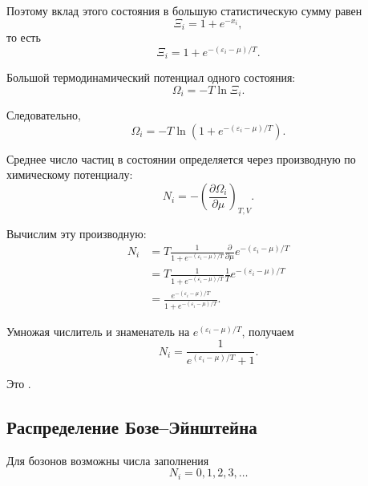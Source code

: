 \documentclass[../final.tex]{subfiles}
\begin{document}
Поэтому вклад этого состояния в большую статистическую сумму равен
%
\begin{equation*}
    \Xi_i
    =
    1+e^{-x_i},
\end{equation*}
%
то есть
%
\[
    \boxed{
        \Xi_i
        =
        1
        +
        e^{-(\varepsilon_i-\mu)/T}
    }.
\]

Большой термодинамический потенциал одного состояния:
%
\begin{equation*}
    \Omega_i
    =
    -T\ln\Xi_i.
\end{equation*}

Следовательно,
%
\[
    \boxed{
        \Omega_i
        =
        -T
        \ln
        \left(
            1
            +
            e^{-(\varepsilon_i-\mu)/T}
        \right)
    }.
\]

Среднее число частиц в состоянии определяется через производную
по химическому потенциалу:
%
\begin{equation*}
    N_i
    =
    -
    \left(
        \frac{\partial\Omega_i}{\partial\mu}
    \right)_{T,V}.
\end{equation*}

Вычислим эту производную:
%
\begin{align*}
    N_i
    &=
    T
    \frac{1}{
        1+e^{-(\varepsilon_i-\mu)/T}
    }
    \frac{\partial}{\partial\mu}
    e^{-(\varepsilon_i-\mu)/T}
    \\[4pt]
    &=
    T
    \frac{1}{
        1+e^{-(\varepsilon_i-\mu)/T}
    }
    \frac{1}{T}
    e^{-(\varepsilon_i-\mu)/T}
    \\[4pt]
    &=
    \frac{
        e^{-(\varepsilon_i-\mu)/T}
    }{
        1+e^{-(\varepsilon_i-\mu)/T}
    }.
\end{align*}

Умножая числитель и знаменатель на
$e^{(\varepsilon_i-\mu)/T}$, получаем
%
\[
    \boxed{
        N_i
        =
        \frac{1}{
            e^{(\varepsilon_i-\mu)/T}+1
        }
    }.
\]

Это .


\subsection{Распределение Бозе--Эйнштейна}

Для бозонов возможны числа заполнения
%
\begin{equation*}
    N_i
    =
    0,1,2,3,\ldots
\end{equation*}
\end{document}
